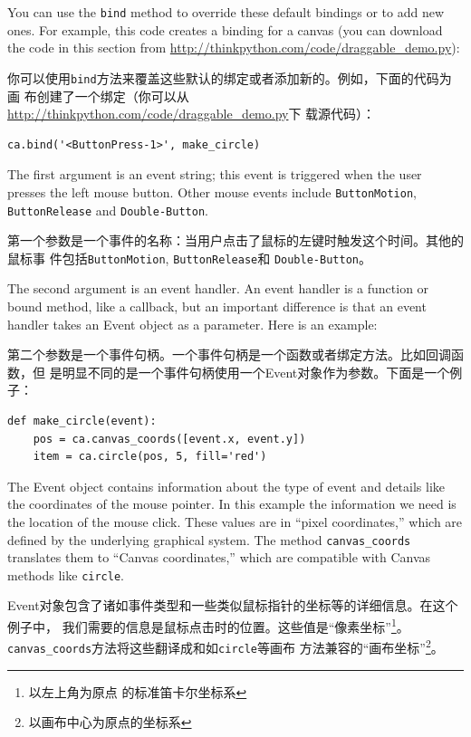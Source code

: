 \documentclass[10pt]{book}
\begin{document}
\begin{CJK}{UTF8}{gbsn}
You can use the {\tt bind} method to override these default
bindings or to add new ones.  For example, this code creates a
binding for a canvas (you can download the code in this
section from \url{http://thinkpython.com/code/draggable_demo.py}):

你可以使用{\tt bind}方法来覆盖这些默认的绑定或者添加新的。例如，下面的代码为画
布创建了一个绑定（你可以从\url{http://thinkpython.com/code/draggable_demo.py}下
载源代码）：

\begin{verbatim}
ca.bind('<ButtonPress-1>', make_circle)
\end{verbatim}
%
The first argument is an event string; this event is triggered
when the user presses the left mouse button.  Other mouse
events include {\tt ButtonMotion}, {\tt ButtonRelease} and
{\tt Double-Button}.

第一个参数是一个事件的名称：当用户点击了鼠标的左键时触发这个时间。其他的鼠标事
件包括{\tt ButtonMotion}, {\tt ButtonRelease}和 {\tt Double-Button}。

The second argument is an event handler.  An event handler
is a function or bound method, like a callback, but an important
difference is that an event handler takes an Event object as a
parameter.  Here is an example:

第二个参数是一个事件句柄。一个事件句柄是一个函数或者绑定方法。比如回调函数，但
是明显不同的是一个事件句柄使用一个Event对象作为参数。下面是一个例子：

\begin{verbatim}
def make_circle(event):
    pos = ca.canvas_coords([event.x, event.y])
    item = ca.circle(pos, 5, fill='red')
\end{verbatim}
%
The Event object contains information about the type of event and
details like the coordinates of the mouse pointer.  In this example
the information we need is
the location of the mouse click.  These
values are in ``pixel coordinates,'' which are defined by the
underlying graphical system.  The method \verb"canvas_coords"
translates them to ``Canvas coordinates,'' which are compatible with
Canvas methods like {\tt circle}.

Event对象包含了诸如事件类型和一些类似鼠标指针的坐标等的详细信息。在这个例子中，
我们需要的信息是鼠标点击时的位置。这些值是``像素坐标''\footnote{以左上角为原点
的标准笛卡尔坐标系}。\verb"canvas_coords"方法将这些翻译成和如{\tt circle}等画布
方法兼容的``画布坐标''\footnote{以画布中心为原点的坐标系}。


\end{CJK}
\end{document}
